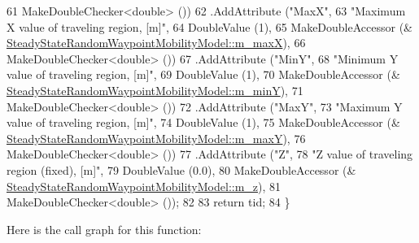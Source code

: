 \begin{DoxyCode}
61                    MakeDoubleChecker<double> ())
62     .AddAttribute (\textcolor{stringliteral}{"MaxX"},
63                    \textcolor{stringliteral}{"Maximum X value of traveling region, [m]"},
64                    DoubleValue (1),
65                    MakeDoubleAccessor (&
      \hyperlink{classns3_1_1SteadyStateRandomWaypointMobilityModel_a7e404b5d33a31d542ad95fd857ea1651}{SteadyStateRandomWaypointMobilityModel::m\_maxX}),
66                    MakeDoubleChecker<double> ())
67     .AddAttribute (\textcolor{stringliteral}{"MinY"},
68                    \textcolor{stringliteral}{"Minimum Y value of traveling region, [m]"},
69                    DoubleValue (1),
70                    MakeDoubleAccessor (&
      \hyperlink{classns3_1_1SteadyStateRandomWaypointMobilityModel_aa208b74985a3dfd89206e0fbf582186f}{SteadyStateRandomWaypointMobilityModel::m\_minY}),
71                    MakeDoubleChecker<double> ())
72     .AddAttribute (\textcolor{stringliteral}{"MaxY"},
73                    \textcolor{stringliteral}{"Maximum Y value of traveling region, [m]"},
74                    DoubleValue (1),
75                    MakeDoubleAccessor (&
      \hyperlink{classns3_1_1SteadyStateRandomWaypointMobilityModel_aebede763f8363a98d153a19523d0a131}{SteadyStateRandomWaypointMobilityModel::m\_maxY}),
76                    MakeDoubleChecker<double> ())
77     .AddAttribute (\textcolor{stringliteral}{"Z"},
78                    \textcolor{stringliteral}{"Z value of traveling region (fixed), [m]"},
79                    DoubleValue (0.0),
80                    MakeDoubleAccessor (&
      \hyperlink{classns3_1_1SteadyStateRandomWaypointMobilityModel_a702c7ffbfca3cea2b53e5fe671fd973d}{SteadyStateRandomWaypointMobilityModel::m\_z}),
81                    MakeDoubleChecker<double> ());
82 
83   \textcolor{keywordflow}{return} tid;
84 \}
\end{DoxyCode}


Here is the call graph for this function\+:


